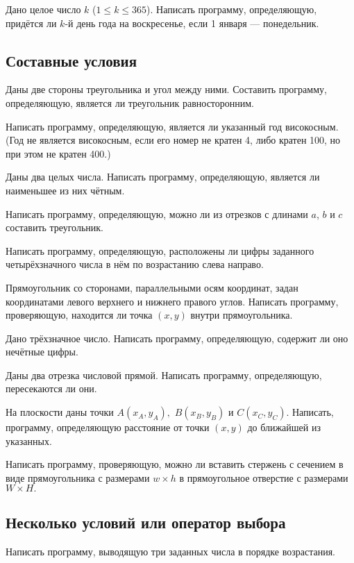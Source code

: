 \task Дано целое число $k$ ($1 \leqslant k \leqslant 365$). Написать
программу, определяющую, придётся ли $k$-й день года на воскресенье,
если 1 января — понедельник.


\subsection{Составные условия} 

\task Даны две стороны треугольника и угол между ними. Составить
программу, определяющую, является ли треугольник равносторонним.

\task Написать программу, определяющую, является ли указанный год
високосным. (Год не является високосным, если
его номер не кратен 4, либо кратен 100, но при этом не кратен 400.)

\task Даны два целых числа. Написать программу, определяющую, является
ли наименьшее из них чётным.

\task Написать программу, определяющую, можно ли из отрезков с длинами
$a$, $b$ и $c$ составить треугольник.

\task Написать программу, определяющую, расположены ли цифры заданного
четырёхзначного числа в нём по возрастанию слева направо.

\task Прямоугольник со сторонами, параллельными осям координат, задан
координатами левого верхнего и нижнего правого углов. Написать
программу, проверяющую, находится ли точка $(x, y)$ внутри
прямоугольника.

\task Дано трёхзначное число. Написать программу, определяющую,
содержит ли оно нечётные цифры.

\task Даны два отрезка числовой прямой. Написать программу,
определяющую, пересекаются ли они.

\task На плоскости даны точки $A(x_A, y_A),$ $B(x_B, y_B)$ и $C(x_C,
y_C)$. Написать, программу, определяющую расстояние от точки $(x, y)$
до ближайшей из указанных.

\task Написать программу, проверяющую, можно ли вставить стержень с
сечением в виде прямоугольника с размерами $w\times h$ в прямоугольное
отверстие с размерами $W\times H.$


\subsection{Несколько условий или оператор выбора}

\task Написать программу, выводящую три заданных числа в порядке
возрастания.

